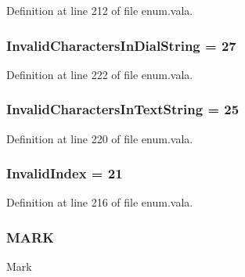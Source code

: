 Definition at line 212 of file enum.\-vala.

\hypertarget{enum_8vala_a944e825978407f13a694783f06264b84}{
\subsubsection[{Invalid\-Characters\-In\-Dial\-String}]{\setlength{\rightskip}{0pt plus 5cm}Invalid\-Characters\-In\-Dial\-String = 27}}\label{enum_8vala_a944e825978407f13a694783f06264b84}


Definition at line 222 of file enum.\-vala.

\hypertarget{enum_8vala_a6d5934c08a338c23fbf114f99193ec68}{
\subsubsection[{Invalid\-Characters\-In\-Text\-String}]{\setlength{\rightskip}{0pt plus 5cm}Invalid\-Characters\-In\-Text\-String = 25}}\label{enum_8vala_a6d5934c08a338c23fbf114f99193ec68}


Definition at line 220 of file enum.\-vala.

\hypertarget{enum_8vala_ad0eb959f723fbb1fde28d6c5f38f2bd7}{
\subsubsection[{Invalid\-Index}]{\setlength{\rightskip}{0pt plus 5cm}Invalid\-Index = 21}}\label{enum_8vala_ad0eb959f723fbb1fde28d6c5f38f2bd7}


Definition at line 216 of file enum.\-vala.

\hypertarget{enum_8vala_a40c0b1257a53cc3f1fbbe6e7dec9c4b0}{
\subsubsection[{M\-A\-R\-K}]{\setlength{\rightskip}{0pt plus 5cm}M\-A\-R\-K}}\label{enum_8vala_a40c0b1257a53cc3f1fbbe6e7dec9c4b0}
Mark 

